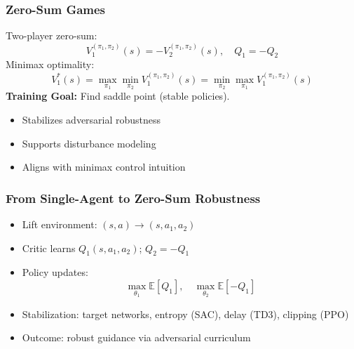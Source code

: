 \begin{frame}
    \frametitle{Zero-Sum Games}
    \small
    Two-player zero-sum: 
    \[
      V_1^{(\pi_1,\pi_2)}(s) = -V_2^{(\pi_1,\pi_2)}(s),\quad
      Q_1 = -Q_2
    \]
    Minimax optimality:
    \[
      V_1^*(s)=\max_{\pi_1}\min_{\pi_2} V_1^{(\pi_1,\pi_2)}(s)
      = \min_{\pi_2}\max_{\pi_1} V_1^{(\pi_1,\pi_2)}(s)
    \]
    \textbf{Training Goal:} Find saddle point (stable policies).
    \begin{itemize}\setlength{\itemsep}{2pt}
        \item Stabilizes adversarial robustness
        \item Supports disturbance modeling
        \item Aligns with minimax control intuition
    \end{itemize}
\end{frame}


\begin{frame}
    \frametitle{From Single-Agent to Zero-Sum Robustness}
    \small
    \begin{itemize}\setlength{\itemsep}{3pt}
        \item Lift environment: $(s,a)\rightarrow (s,a_1,a_2)$
        \item Critic learns $Q_1(s,a_1,a_2)$; $Q_2=-Q_1$
        \item Policy updates:
        \[
          \max_{\theta_1} \mathbb{E}[Q_1],\quad
          \max_{\theta_2} \mathbb{E}[-Q_1]
        \]
        \item Stabilization: target networks, entropy (SAC), delay (TD3), clipping (PPO)
        \item Outcome: robust guidance via adversarial curriculum
    \end{itemize}
\end{frame}